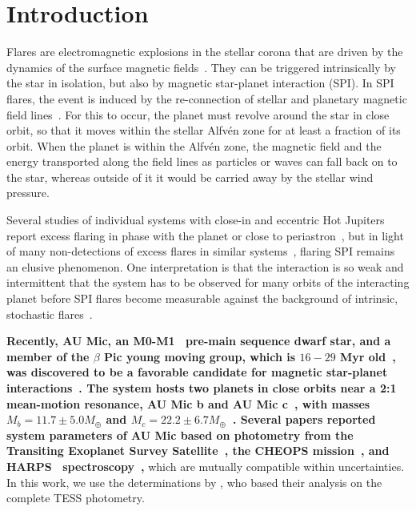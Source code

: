 \documentclass[fleqn,usenatbib]{mnras}%
\begin{document}
\section{Introduction}

Flares are electromagnetic explosions in the stellar corona that are driven by the dynamics of the surface magnetic fields~\citep{benz2010}. They can be triggered intrinsically by the star in isolation, but also by magnetic star-planet interaction (SPI). In SPI flares, the event is induced by the re-connection of stellar and planetary magnetic field lines~\citep{saur2013magnetic,lanza2018close-by,fischer2019}. For this to occur, the planet must revolve around the star in close orbit, so that it moves within the stellar Alfv\'en zone for at least a fraction of its orbit. When the planet is within the Alfv\'en zone, the magnetic field and the energy transported along the field lines as particles or waves can fall back on to the star, whereas outside of it it would be carried away by the stellar wind pressure. 

Several studies of individual systems with close-in and eccentric Hot Jupiters report excess flaring in phase with the planet or close to periastron~\citep{shkolnik2005hot,pillitteri2011,maggio2015}, but in light of many non-detections of excess flares in similar systems~\citep{figueira2016, fischer2019}, flaring SPI remains an elusive phenomenon. One interpretation is that the interaction is so weak and intermittent that the system has to be observed for many orbits of the interacting planet before SPI flares become measurable against the background of intrinsic, stochastic flares~\citep{shkolnik2008nature,lanza2009,saur2013magnetic,strugarek2015}.

\textbf{Recently, AU Mic, an M0-M1~\citep{pecaut2013,gaidos2014} pre-main sequence dwarf star, and a member of the $\beta$ Pic young moving group, which is $16-29$ Myr old~\citep{malo2014,binks2014,mamajek2014,bell2015,binks2016,shkolnik2017,miretroig2020}, was discovered to be a favorable candidate for magnetic star-planet interactions~\citep{kavanagh2021}. The system hosts two planets in close orbits near a 2:1 mean-motion resonance, AU Mic b and AU Mic c~\citep{plavchan2020,martioli2021new}, with masses $M_b=11.7 \pm 5.0 M_\oplus$  and $M_c = 22.2 \pm 6.7 M_\oplus$~\citep{zicher2022one}. Several papers reported system parameters of AU Mic based on photometry from the Transiting Exoplanet Survey Satellite~\citep[TESS,][]{ricker2014}, the CHEOPS mission~\citep{benz2021cheops}, and HARPS~\citep{mayor2003setting} spectroscopy~\citep{plavchan2020, cale2021diving, gilbert2021flares, zicher2022one},} which are mutually compatible within uncertainties. In this work, we use the determinations by \citet{gilbert2021flares}, who based their analysis on the complete TESS photometry.
\end{document}
